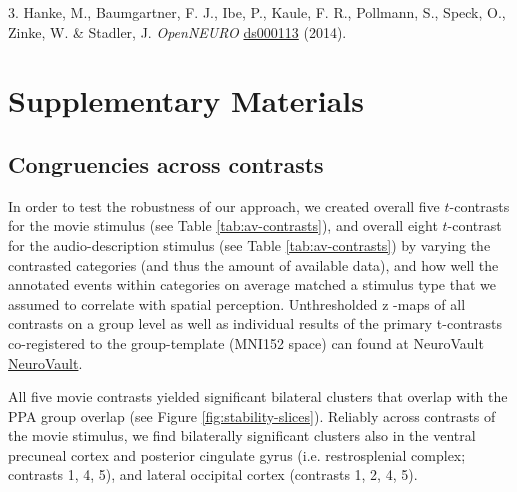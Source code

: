 \documentclass[english]{article}
\begin{document}
3. Hanke, M., Baumgartner, F. J., Ibe, P., Kaule, F. R., Pollmann, S., Speck,
O., Zinke, W. \& Stadler, J. \emph{OpenNEURO}
\href{https://openneuro.org/datasets/ds000113}{ds000113} (2014). 


\appendix

\pagebreak[4]


\section{Supplementary Materials}

\subsection{Congruencies across contrasts}


In order to test the robustness of our approach, we created overall five
$t$-contrasts for the movie stimulus (see Table \ref{tab:av-contrasts}), and
overall eight $t$-contrast for the audio-description stimulus (see Table
\ref{tab:av-contrasts}) by varying the contrasted categories (and thus the
amount of available data), and how well the annotated events within categories
on average matched a stimulus type that we assumed to correlate with spatial
perception.
Unthresholded z -maps of all contrasts on a group level as well as individual
results of the primary t-contrasts co-registered to the group-template (MNI152
space) can found at NeuroVault
\href{https://neurovault.org/collections/KADGMGVZ/}{NeuroVault}.


All five movie contrasts yielded significant bilateral clusters that
overlap with the PPA group overlap (see Figure \ref{fig:stability-slices}).
Reliably across contrasts of the movie stimulus, we find bilaterally
significant clusters also in the ventral precuneal cortex and posterior
cingulate gyrus (i.e. restrosplenial complex; contrasts 1, 4, 5), and lateral
occipital cortex (contrasts 1, 2, 4, 5).
\end{document}
